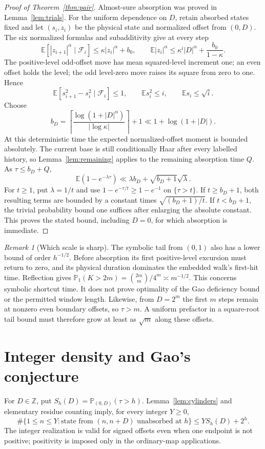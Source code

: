 \documentclass[11pt]{amsart}
\theoremstyle{definition}
\theoremstyle{remark}
\newtheorem{remark}[theorem]{Remark}
\newcommand{\Z}{\mathbb Z}
\newcommand{\E}{\mathbb E}
\newcommand{\PP}{\mathbb P}
\begin{document}
\begin{proof}[Proof of Theorem~\ref{thm:pair}]
Almost-sure absorption was proved in Lemma~\ref{lem:trials}.
For the uniform dependence on $D$, retain absorbed states fixed and let $(s_i,z_i)$ be the physical state and normalized offset from $(0,D)$.
The six normalized formulas and subadditivity give at every step
\[
 \E[|z_{i+1}|^\alpha\mid\mathcal F_i]
 \le\kappa|z_i|^\alpha+b_0,
 \qquad
 \E|z_i|^\alpha\le\kappa^i|D|^\alpha+\frac{b_0}{1-\kappa}.
\]
The positive-level odd-offset move has mean squared-level increment one; an even offset holds the level; the odd level-zero move raises its square from zero to one. Hence
\[
 \E[s_{i+1}^2-s_i^2\mid\mathcal F_i]\le1,
 \qquad \E s_i^2\le i,\qquad \E s_i\le\sqrt i.
\]
Choose
\[
 b_D=\left\lceil\frac{\log(1+|D|^\alpha)}{|\log\kappa|}\right\rceil+1
 \ll 1+\log(1+|D|).
\]
At this deterministic time the expected normalized-offset moment is bounded absolutely. The current base is still conditionally Haar after every labelled history, so Lemma~\ref{lem:remaining} applies to the remaining absorption time $Q$.
As $\tau\le b_D+Q$,
\[
 \E(1-e^{-\lambda\tau})
 \ll\lambda b_D+\sqrt{b_D+1}\sqrt\lambda.
\]
For $t\ge1$, put $\lambda=1/t$ and use
$1-e^{-\tau/t}\ge1-e^{-1}$ on $\{\tau>t\}$.
If $t\ge b_D+1$, both resulting terms are bounded by a constant times $\sqrt{(b_D+1)/t}$. If $t<b_D+1$, the trivial probability bound one suffices after enlarging the absolute constant. This proves the stated bound, including $D=0$, for which absorption is immediate.
\end{proof}

\begin{remark}[Which scale is sharp]
The symbolic tail from $(0,1)$ also has a lower bound of order $h^{-1/2}$. Before absorption its first positive-level excursion must return to zero, and its physical duration dominates the embedded walk's first-hit time. Reflection gives
$\PP_1(K>2m)=\binom{2m}{m}/4^m\asymp m^{-1/2}$.
This concerns symbolic shortcut time. It does not prove optimality of the Gao deficiency bound or the permitted window length. Likewise, from $D=2^m$ the first $m$ steps remain at nonzero even boundary offsets, so $\tau>m$. A uniform prefactor in a square-root tail bound must therefore grow at least as $\sqrt m$ along these offsets.
\end{remark}

\section{Integer density and Gao's conjecture}\label{sec:gao}
For $D\in\Z$, put $S_h(D)=\PP_{(0,D)}(\tau>h)$. Lemma~\ref{lem:cylinders} and elementary residue counting imply, for every integer $Y\ge0$,
\begin{equation}\label{eq:residue-count}
 \#\{1\le n\le Y:\text{state from }(n,n+D)\text{ unabsorbed at }h\}
 \le YS_h(D)+2^h.
\end{equation}
The integer realization is valid for signed offsets even when one endpoint is not positive; positivity is imposed only in the ordinary-map applications.
\end{document}
